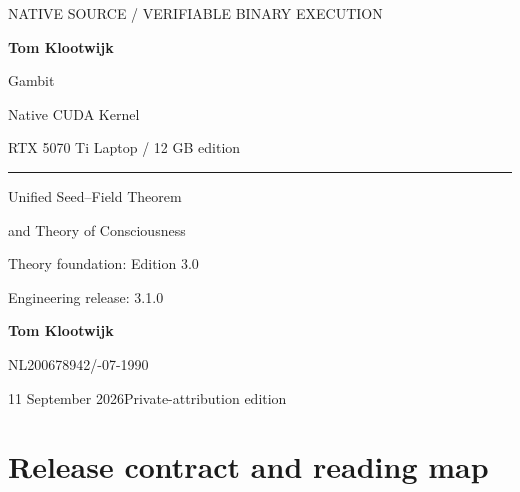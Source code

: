 \documentclass[11pt,a4paper]{article}
\begin{document}
\begin{titlepage}
\thispagestyle{empty}
{\sffamily\color{accent}\large NATIVE SOURCE / VERIFIABLE BINARY EXECUTION\par}
\vspace{18mm}
{\sffamily\bfseries\color{ink}\fontsize{32}{37}\selectfont Tom Klootwijk\par Gambit\par}
\vspace{8mm}
{\sffamily\color{ink}\fontsize{24}{29}\selectfont Native CUDA Kernel\par}
\vspace{3mm}
{\sffamily\color{muted}\Large RTX 5070 Ti Laptop / 12 GB edition\par}
\vspace{9mm}
{\color{accent}\rule{\linewidth}{1.2pt}\par}
\vspace{6mm}
{\large Unified Seed--Field Theorem\par and Theory of Consciousness\par}
\vspace{2mm}
{\color{muted}Theory foundation: Edition 3.0\par Engineering release: 3.1.0\par}
\vspace{12mm}
{\large\bfseries Tom Klootwijk\par}
{NL200678942\quad /-07-1990\par}
\vfill
\begingroup\setlength{\fboxsep}{11pt}\color{ink}
\endgroup\par
\vspace{6mm}
{\small\color{muted}11 September 2026\hfill Private-attribution edition\par}
\end{titlepage}
{\small\setlength{\parskip}{0pt}\tableofcontents}
\clearpage
{}
\section{Release contract and reading map}\label{release-contract-and-reading-map}
\end{document}
